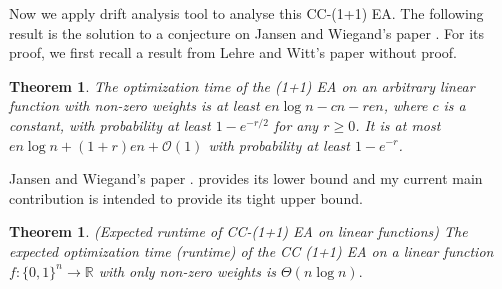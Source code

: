 \documentclass[a4paper,11pt]{report}
\theoremstyle{plain} %
\newtheorem{thm}{Theorem}[section]
\newtheorem*{thm*}{Theorem}
\theoremstyle{definition} %
\theoremstyle{remark} %
\begin{document}
\par Now we apply drift analysis tool to analyse this CC-(1+1) EA. The following result is the solution to a conjecture on Jansen and Wiegand's paper \citep{jansen_cooperative_2004}.  For its proof, we first recall a result from Lehre and Witt's paper \citep{lehre_general_2018} without proof. 
\begin{thm*} The optimization time of the (1+1) EA on an arbitrary linear function with non-zero weights is at least $en \log n -cn -ren$, where $c$ is a constant, with probability at least $1-e^{-r/2}$ for any $r \geq 0$. It is at most $en \log n +(1+r)en + \mathcal{O}(1)$ with probability at least $1-e^{-r}$.
 
\end{thm*}

\par Jansen and Wiegand's paper \citep{jansen_cooperative_2004}. provides its lower bound and my current main contribution is intended to provide its tight upper bound.

\begin{thm}(Expected runtime of CC-(1+1) EA on linear functions)
The expected optimization time (runtime) of the CC (1+1) EA on a linear function $f: \{0,1\}^n \rightarrow \mathbb{R}$ with only non-zero weights is $\Theta (n\log n).$
\end{thm}
\end{document}
